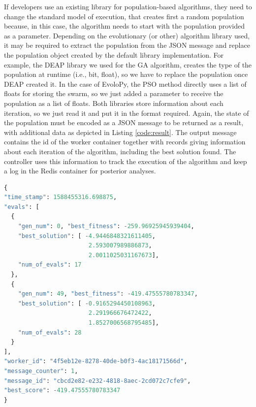 \documentclass[review]{elsarticle}
\begin{document}
If developers use an existing library for population-based algorithms, they need
to change the standard model of execution, that creates first a random
population because, in this case, the algorithm needs to start with the
population provided as a parameter. Depending on the evolutionary (or other) algorithm library used,
it may be required to extract the population from the
JSON message and replace the population object created by the default library implementation. For
example, the DEAP library we used for the GA algorithm, creates the type of the
population at runtime (i.e., bit, float), so we have to replace the population
once DEAP created it. In the case of EvoloPy, the PSO method directly uses a
list of floats for storing the swarm, so we just added a parameter to receive
the population as a list of floats. Both libraries store information about each
iteration, so we just read it and put it in the format required.
Again, the state of the population must be encoded as a JSON message to be
returned as a result, with additional data as
depicted in Listing \ref{code:result}. The output message contains the id of the
worker container together with records giving information about each iteration
of the algorithm, including the best solution found. The controller uses this
information to track the execution of the algorithm and keep a log in the Redis
container for posterior analyses.

\begin{lstlisting}[language=Python, caption=Fragment of an output message, label=code:result ]
{
"time_stamp": 1588455316.698875,
"evals": [
  {
    "gen_num": 0, "best_fitness": -259.96925945939404,
    "best_solution": [ -4.9446848321611405, 
                        2.593007989886873, 
                        2.0011025031167673],
    "num_of_evals": 17
  },
  {
    "gen_num": 49, "best_fitness": -419.47555780783347,
    "best_solution": [ -0.9165294450108963, 
                        2.291966676472422, 
                        1.8527006568795485],
    "num_of_evals": 28
  }
],
"worker_id": "4f5eb12e-8278-40de-b0f3-4ac18171566d",
"message_counter": 1,
"message_id": "cbcd2e82-e232-4818-8aec-2cd072c7cfe9",
"best_score": -419.47555780783347
}
\end{lstlisting}
\end{document}
